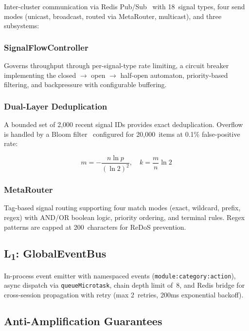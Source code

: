 \documentclass[journal,10pt]{IEEEtran}
\newcommand{\code}[1]{\texttt{#1}}
\newcommand{\layerone}{L\textsubscript{1}}
\begin{document}
Inter-cluster communication via Redis Pub/Sub~\cite{redis} with 18~signal types, four send modes (unicast, broadcast, routed via MetaRouter, multicast), and three subsystems:

\subsubsection{SignalFlowController}

Governs throughput through per-signal-type rate limiting, a circuit breaker~\cite{nygard2007} implementing the closed $\to$ open $\to$ half-open automaton, priority-based filtering, and backpressure with configurable buffering.

\subsubsection{Dual-Layer Deduplication}

A bounded set of 2{,}000 recent signal IDs provides exact deduplication. Overflow is handled by a Bloom filter~\cite{bloom1970} configured for 20{,}000~items at 0.1\% false-positive rate:

\begin{equation}
m = -\frac{n \ln p}{(\ln 2)^2}, \quad k = \frac{m}{n} \ln 2
\label{eq:bloom}
\end{equation}

\subsubsection{MetaRouter}

Tag-based signal routing supporting four match modes (exact, wildcard, prefix, regex) with AND/OR boolean logic, priority ordering, and terminal rules. Regex patterns are capped at 200~characters for ReDoS prevention.

\subsection{\layerone: GlobalEventBus}
\label{sec:l1}

In-process event emitter with namespaced events (\code{module:category:action}), async dispatch via \code{queueMicrotask}, chain depth limit of~8, and Redis bridge for cross-session propagation with retry (max 2~retries, 200ms exponential backoff).

\subsection{Anti-Amplification Guarantees}
\end{document}
